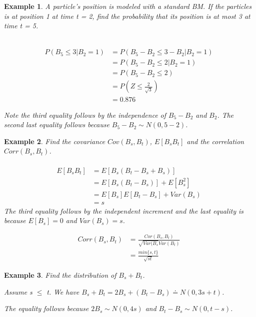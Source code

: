 \documentclass[12pt]{article}
\newtheorem{example}{Example}
\begin{document}
\begin{example}
    A particle's position is modeled with a standard BM. If the particles is at position 1 at time t = 2, find the probability that its position is at most 3 at time t = 5.
    \\
    \\
    \begin{center}
        \begin{align*}
            P(B_5 \leq 3 | B_2 = 1) & = P(B_5 - B_2 \leq 3 - B_2 | B_2 = 1) \\
            & = P(B_5 - B_2 \leq 2 | B_2 = 1) \\
            & = P(B_5 - B_2 \leq 2) \\
            & = P(Z \leq \frac{2}{\sqrt{3}}) \\
            & = 0.876
        \end{align*}
    \end{center}
    Note the third equality follows by the independence of $B_5-B_2$ and $B_2$. The second last equality follows because $B_5 - B_2 \sim N(0, 5-2)$.
\end{example}

\begin{example}
    Find the covariance $Cov(B_s, B_t)$, $E[B_sB_t]$ and the correlation $Corr(B_s,B_t)$.
    \\
    \\
    \begin{equation*}
        \begin{split}
            E[B_sB_t] & = E[B_s(B_t-B_s+B_s)] \\
            & = E[B_s(B_t - B_s)] + E[B_s^2] \\
            & = E[B_s]E[B_t - B_s] + Var(B_s) \\
            & = s
        \end{split}
    \end{equation*}
    The third equality follows by the independent increment and the last equality is because $E[B_s] = 0$ and $Var(B_s) = s$.
    \begin{center}
        \begin{align*}
            Corr(B_s,B_t) & = \frac{Cor(B_s,B_t)}{\sqrt{Var(B_s}Var(B_t)} \\
            & = \frac{min\{s,t\}}{\sqrt{st}}
        \end{align*}
    \end{center}
\end{example}

\begin{example}
    Find the distribution of $B_s + B_t$.
    \begin{center}
        Assume s $\leq$ t. We have $B_s + B_t = 2B_s + (B_t - B_s) \doteq N(0,3s+t)$.
    \end{center}
    The equality follows because $2B_s \sim N(0,4s)$ and $B_t - B_s \sim N(0,t-s)$.
\end{example}
\end{document}
